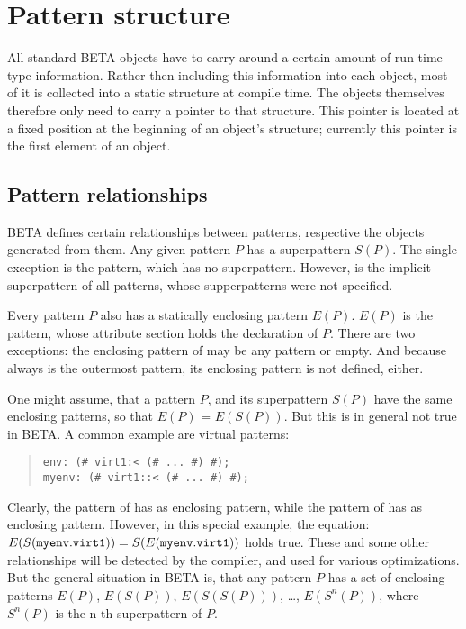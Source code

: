 \section{Pattern structure}
All standard BETA objects have to carry around a certain amount
of run time type information.  Rather then including this
information into each object, most of it is collected into a
static structure at compile time.  The objects themselves
therefore only need to carry a pointer to that structure.  This
pointer is located at a fixed position at the beginning of
an object's structure; currently this pointer is the first
element of an object.

\subsection{Pattern relationships}
BETA defines certain relationships between patterns, respective
the objects generated from them.  Any given pattern $P$ has a
superpattern $S(P)$.  The single exception is the 
pattern, which has no superpattern.  However,  is the
implicit superpattern of all patterns, whose supperpatterns were
not specified.

Every pattern $P$ also has a statically enclosing pattern $E(P)$.
$E(P)$ is the pattern, whose attribute section holds the
declaration of $P$.  There are two exceptions: the enclosing
pattern of  may be any pattern or empty.  And because
 always is the outermost pattern, its enclosing
pattern is not defined, either.

One might assume, that a pattern $P$, and its superpattern $S(P)$
have the same enclosing patterns, so that $E(P)$ = $E(S(P))$.  But
this is in general not true in BETA.  A common example are virtual
patterns:
\begin{quote}\begin{verbatim}env: (# virt1:< (# ... #) #);
myenv: (# virt1::< (# ... #) #);
\end{verbatim}\end{quote}
Clearly, the  pattern of  has  as
enclosing pattern, while the  pattern of 
has  as enclosing pattern.  However, in this special
example, the equation: $E(S({\tt myenv.virt1})) =
S(E({\tt myenv.virt1}))$ holds true.  These and some other
relationships will be detected by the compiler, and used for
various optimizations.  But the general situation in BETA
is, that any pattern $P$ has
a set of enclosing patterns $E(P)$, $E(S(P))$, $E(S(S(P)))$,
\ldots, $E(S^n(P))$, where $S^n(P)$ is the n-th superpattern
of $P$.


